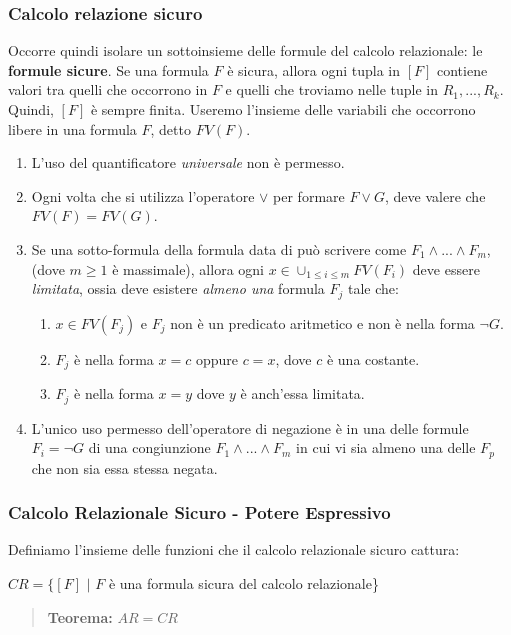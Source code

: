 \documentclass{article}
\begin{document}
\subsubsection{Calcolo relazione sicuro}
Occorre quindi isolare un sottoinsieme  delle formule del calcolo relazionale: le \textbf{formule sicure}. Se una formula $F$ è sicura, allora ogni tupla in $[F]$ contiene valori tra quelli che occorrono in $F$ e quelli che troviamo nelle tuple in $R_1,...,R_k$. Quindi, $[F]$ è sempre finita. Useremo l'insieme delle variabili che occorrono libere in una formula $F$, detto $FV(F)$.
\begin{enumerate}
    \item L'uso del quantificatore \textit{universale} non è permesso.
    \item Ogni volta che si utilizza l'operatore $\lor$ per formare $F\lor G$, deve valere che $FV(F) = FV(G)$.
    \item Se una sotto-formula della formula data di può scrivere come $F_1\land...\land F_m$, (dove $m\geq 1$ è massimale), allora ogni $x\in\cup_{1\leq i\leq m}FV(F_i)$ deve essere \textit{limitata}, ossia deve esistere \textit{almeno una} formula $F_j$ tale che:
    \begin{enumerate}
        \item $x\in FV(F_j)$ e $F_j$ non è un predicato aritmetico e non è nella forma $\lnot G$.
        \item $F_j$ è nella forma $x=c$ oppure $c=x$, dove $c$ è una costante.
        \item $F_j$ è nella forma $x=y$ dove $y$ è anch'essa limitata.
    \end{enumerate}
    \item L'unico uso permesso dell'operatore di negazione è in una delle formule $F_i =\lnot G$ di una congiunzione $F_1\land...\land F_m$ in cui vi sia almeno una delle $F_p$ che non sia essa stessa negata.
\end{enumerate}

\subsubsection{Calcolo Relazionale Sicuro - Potere Espressivo}
Definiamo l'insieme delle funzioni che il calcolo relazionale sicuro cattura:

\bigskip

$CR = \{[F]\,\,|\,\,F$ è una formula sicura del calcolo relazionale\}

\begin{quote}
    \textbf{Teorema:} $AR=CR$
\end{quote}
\end{document}
